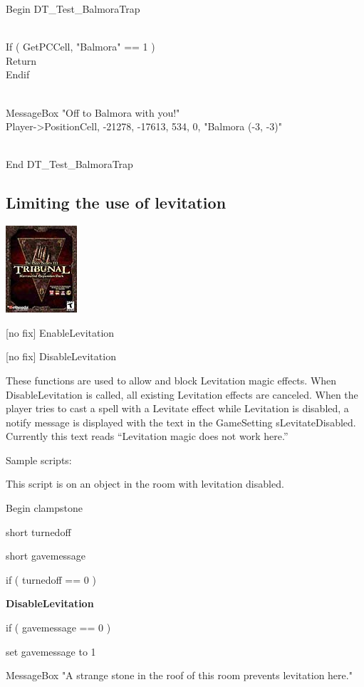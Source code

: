 \documentclass[
]{article}
\begin{document}
Begin DT\_Test\_BalmoraTrap\\
\strut \\
If ( GetPCCell, "Balmora" == 1 )\\
Return\\
Endif\\
\strut \\
MessageBox "Off to Balmora with you!"\\
Player-\textgreater PositionCell, -21278, -17613, 534, 0, "Balmora (-3,
-3)"\\
\strut \\
End DT\_Test\_BalmoraTrap

\hypertarget{limiting-the-use-of-levitation}{%
\subsection{Limiting the use of
levitation}\label{limiting-the-use-of-levitation}}

\includegraphics{media/image6.png}

{[}no fix{]} EnableLevitation

{[}no fix{]} DisableLevitation

These functions are used to allow and block Levitation magic effects.
When DisableLevitation is called, all existing Levitation effects are
canceled. When the player tries to cast a spell with a Levitate effect
while Levitation is disabled, a notify message is displayed with the
text in the GameSetting sLevitateDisabled. Currently this text reads
``Levitation magic does not work here.''

Sample scripts:

This script is on an object in the room with levitation disabled.

Begin clampstone

short turnedoff

short gavemessage

if ( turnedoff == 0 )

\textbf{DisableLevitation}

if ( gavemessage == 0 )

set gavemessage to 1

MessageBox "A strange stone in the roof of this room prevents levitation
here."
\end{document}
